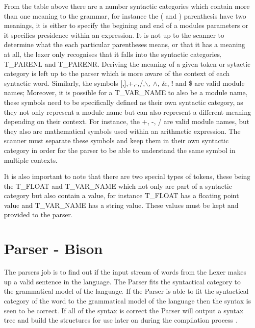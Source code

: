 \begin{flushleft}
From the table above there are a number syntactic categories which contain more than one meaning to the grammar, for instance the ( and ) parenthesis have two meanings, it is either to specify the begining and end of a modules parameters or it specifies presidence within an expression.  It is not up to the scanner to determine what the each particular parentheses means, or that it has a meaning at all, the lexer only recognises that it falls into the syntactic categories, T\_PARENL and T\_PARENR. Deriving the meaning of a given token or sytactic category is left up to the parser which is more aware of the context of each syntactic word. Similarly, the symbols [,],+,-,/,$\backslash$, $\land$, $\&$, ! and \$ are valid module names; Moreover, it is possible for a T\_VAR\_NAME to also be a module name, these symbols need to be specifically defined as their own syntactic category, as they not only represent a module name but can also represent a different meaning depending on their context. For instance, the +, -, / are valid module names, but they also are mathematical symbols used within an arithmetic expression. The scanner must separate these symbols and keep them in their own syntactic category in order for the parser to be able to understand the same symbol in multiple contexts. \\

\vspace{5mm}


It is also important to note that there are two special types of tokens, these being the T\_FLOAT and T\_VAR\_NAME which not only are part of a syntactic category but also contain a value, for instance T\_FLOAT has a floating point value and T\_VAR\_NAME has a string value. These values must be kept and provided to the parser.\\

\end{flushleft}

\section{Parser - Bison} \label{Bison}

The parsers job is to find out if the input stream of words from the \gls{Lexer} makes up a valid sentence in the language. The \gls{Parser} fits the syntactical category to the grammatical model of the language. If the \gls{Parser} is able to fit the syntactical category of the word to the grammatical model of the language then the syntax is seen to be correct. If all of the syntax is correct the \gls{Parser} will output a syntax tree and build the structures for use later on during the compilation process \cite{cooper2011engineering}.

